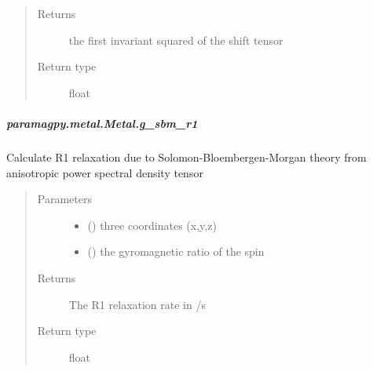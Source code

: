 \documentclass[a4paper,10pt,english,openany,oneside]{sphinxmanual}
\begin{document}
\begin{fulllineitems}
\begin{fulllineitems}
\begin{fulllineitems}
\begin{quote}
\begin{description}
\item[{Returns}] \leavevmode
{} \textendash{} the first invariant squared of the shift tensor

\item[{Return type}] \leavevmode
float

\end{description}\end{quote}

\end{fulllineitems}



\subparagraph{paramagpy.metal.Metal.g\_sbm\_r1}
\label{\detokenize{reference/generated/paramagpy.metal.Metal.g_sbm_r1:paramagpy-metal-metal-g-sbm-r1}}\label{\detokenize{reference/generated/paramagpy.metal.Metal.g_sbm_r1::doc}}

\begin{fulllineitems}
\label{\detokenize{reference/generated/paramagpy.metal.Metal.g_sbm_r1:paramagpy.metal.Metal.g_sbm_r1}}
Calculate R1 relaxation due to Solomon-Bloembergen-Morgan theory
from anisotropic power spectral density tensor
\begin{quote}\begin{description}
\item[{Parameters}] \leavevmode\begin{itemize}
\item {} 
 () \textendash{} three coordinates (x,y,z)

\item {} 
 () \textendash{} the gyromagnetic ratio of the spin

\end{itemize}

\item[{Returns}] \leavevmode
{} \textendash{} The R1 relaxation rate in /s

\item[{Return type}] \leavevmode
float

\end{description}\end{quote}


\end{fulllineitems}
\end{fulllineitems}
\end{fulllineitems}
\end{document}
